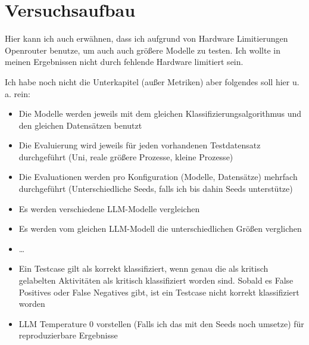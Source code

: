 \chapter{Versuchsaufbau}\label{ch:versuchsaufbau}

Hier kann ich auch erwähnen, dass ich aufgrund von Hardware Limitierungen Openrouter benutze, um auch auch größere Modelle zu testen. Ich wollte in meinen Ergebnissen nicht durch fehlende Hardware limitiert sein.

Ich habe noch nicht die Unterkapitel (außer Metriken) aber folgendes soll hier u.\,a. rein:

\begin{itemize}
    \item Die Modelle werden jeweils mit dem gleichen Klassifizierungsalgorithmus und den gleichen Datensätzen benutzt
    \item Die Evaluierung wird jeweils für jeden vorhandenen Testdatensatz durchgeführt (Uni, reale größere Prozesse, kleine Prozesse)
    \item Die Evaluationen werden pro Konfiguration (Modelle, Datensätze) mehrfach durchgeführt (Unterschiedliche Seeds, falls ich bis dahin Seeds unterstütze)
    \item Es werden verschiedene LLM-Modelle vergleichen
    \item Es werden vom gleichen LLM-Modell die unterschiedlichen Größen verglichen
    \item \ldots
    \item Ein Testcase gilt als korrekt klassifiziert, wenn genau die als kritisch gelabelten Aktivitäten als kritisch klassifiziert worden sind. Sobald es False Positives oder False Negatives gibt, ist ein Testcase nicht korrekt klassifiziert worden
    \item LLM Temperature 0 vorstellen (Falls ich das mit den Seeds noch umsetze) für reproduzierbare Ergebnisse
\end{itemize}
